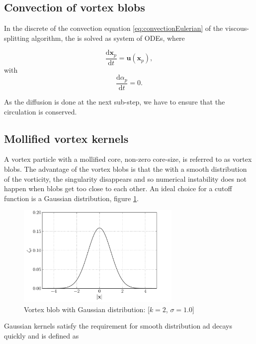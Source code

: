 \subsection{Convection of vortex blobs}

In the discrete of the convection equation \ref{eq:convectionEulerian} of the viscous-splitting algorithm, the is solved as system of ODEs, where

	\begin{equation}
	\frac{\mathrm{d}\mathbf{x}_p}{\mathrm{d}t} = \mathbf{u}\left(\mathbf{x}_p\right),
	\end{equation}
with
	\begin{equation}
	\frac{\mathrm{d}\alpha_p}{\mathrm{d}t} = 0.
	\end{equation}

As the diffusion is done at the next sub-step, we have to ensure that the circulation is conserved.


\subsection{Mollified vortex kernels}

A vortex particle with a mollified core, non-zero core-size, is referred to as vortex blobs. The advantage of the vortex blobs is that the with a smooth distribution of the vorticity, the singularity disappears and so numerical instability does not happen when blobs get too close to each other. An ideal choice for a cutoff function is a Gaussian distribution, figure \ref{fig:gaussianDistribution}.

	\begin{figure}[t]
	\centering
	\includegraphics[width=0.7\textwidth]{figures/lagrangian/gaussianKernel.pdf}
	\caption{Vortex blob with Gaussian distribution: [$k=2$, $\sigma=1.0$]}
	\label{fig:gaussianDistribution}
	\end{figure}

Gaussian kernels satisfy the requirement for smooth distribution ad decays quickly and is defined as
	
